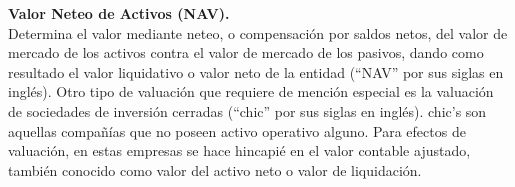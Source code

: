 \textcolor{principal}{\textbf{Valor Neteo de Activos (NAV).} }\\

Determina el valor mediante neteo, o compensaci\'on por saldos netos, del valor de mercado de los activos contra el valor de mercado de los pasivos, dando como resultado el valor liquidativo o valor neto de la entidad (``\gls{NAV}'' por sus siglas en ingl\'es). Otro tipo de valuaci\'on que requiere de menci\'on especial es la valuaci\'on de sociedades de inversi\'on cerradas (``\gls{chic}'' por sus siglas en ingl\'es). \gls{chic}'s son aquellas compa\~n\'ias que no poseen activo operativo alguno. Para efectos de valuaci\'on, en estas empresas se hace hincapi\'e en el valor contable ajustado, tambi\'en conocido como valor del activo neto o valor de liquidaci\'on. 